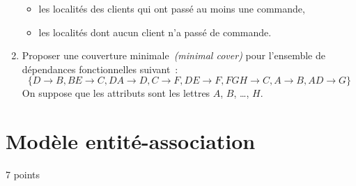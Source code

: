 \documentclass[a4paper,11pt]{article}
\begin{document}
\begin{enumerate}
\begin{itemize}
      \item les localités des clients qui ont passé au moins une commande,
      \item les localités dont aucun client n'a passé de commande.
    \end{itemize}
  \item Proposer une couverture minimale~\emph{(minimal cover)} pour l'ensemble de dépendances fonctionnelles suivant~:
    \[
      \{D \rightarrow B, BE \rightarrow C, DA \rightarrow D, C \rightarrow F, DE \rightarrow F, FGH \rightarrow C, A \rightarrow B, AD \rightarrow G\}
    \]
    On suppose que les attributs sont les lettres $A$, $B$, \dots, $H$.
\end{enumerate}

\section{Modèle entité-association}{7 points}
\end{document}
